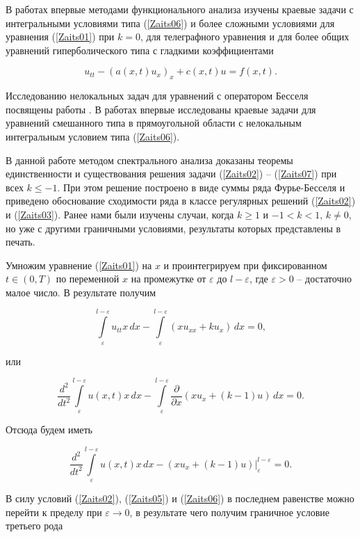 В работах \cite{Zaitseva:PulkLS2,Zaitseva:PulkLS3} впервые методами функционального анализа изучены краевые задачи с интегральными условиями типа (\ref{Zaits06}) и более сложными условиями для уравнения (\ref{Zaits01}) при $k=0$, для телеграфного уравнения и для более общих уравнений гиперболического типа с гладкими коэффициентами

$$u_{tt}-\left(a(x,t)u_x\right)_x+c(x,t)u=f(x,t).$$



Исследованию нелокальных задач для уравнений с оператором Бесселя посвящены работы \cite{Zaitseva:BenYou,Zaitseva:Beil,Zaitseva:BouzMes,Zaitseva:SYK1}. В работах \cite{Zaitseva:SKB1,Zaitseva:SKB2,Zaitseva:SYK2,Zaitseva:SKB3} впервые исследованы краевые задачи для уравнений смешанного типа в прямоугольной области с нелокальным интегральным условием типа (\ref{Zaits06}).



В данной работе методом спектрального анализа \cite{Zaitseva:SKB1,Zaitseva:SKB2,Zaitseva:SYK2,Zaitseva:SKB3} доказаны теоремы единственности и существования решения задачи (\ref{Zaits02}) -- (\ref{Zaits07}) при всех $k\leq -1$. При этом решение построено в виде суммы ряда Фурье-Бесселя и приведено обоснование сходимости ряда в классе регулярных решений (\ref{Zaits02}) и (\ref{Zaits03}). Ранее нами были изучены случаи, когда $k\geq1$ и $-1<k<1,\,k\neq0$, но уже с другими граничными условиями, результаты которых представлены в печать.



Умножим уравнение (\ref{Zaits01}) на $x$ и проинтегрируем при фиксированном $t\in(0,T)$ по переменной $x$ на промежутке от $\varepsilon$ до $l-\varepsilon$, где $\varepsilon>0$ -- достаточно малое число. В результате получим

$$\int\limits_\varepsilon^{l-\varepsilon}u_{tt}x\,dx-\int\limits_\varepsilon^{l-\varepsilon}(xu_{xx}+ku_x)\,dx=0,$$

или

$$\frac{d^2}{dt^2}\int\limits_\varepsilon^{l-\varepsilon}u(x,t)x\,dx-\int\limits_\varepsilon^{l-\varepsilon}\frac{\partial }{\partial x}(xu_x+(k-1)u)\,dx=0.$$

Отсюда будем иметь

$$\frac{d^2}{dt^2}\int\limits_\varepsilon^{l-\varepsilon}u(x,t)x\,dx-\left(xu_x+(k-1)u\right)\Bigr|_\varepsilon^{l-\varepsilon}=0.$$

В силу условий (\ref{Zaits02}), (\ref{Zaits05}) и (\ref{Zaits06}) в последнем равенстве можно перейти к пределу при $\varepsilon\rightarrow0$, в результате чего получим граничное условие третьего рода

